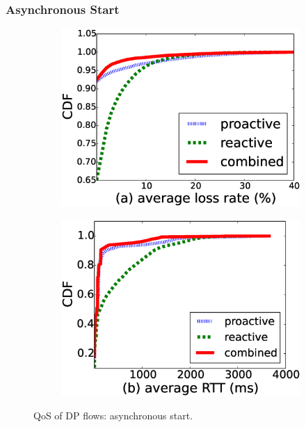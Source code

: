 
\subsubsection{Asynchronous Start}

\begin{figure}[!h]
  \begin{subfigure}[t]{0.49\linewidth}
   \centering
   \includegraphics[width=\columnwidth]{chap-scalims/figure/nonsyn-rttloss1.eps}
  \end{subfigure}
  \begin{subfigure}[t]{0.49\linewidth}
     \centering
     \includegraphics[width=\columnwidth]{chap-scalims/figure/nonsyn-rttloss2.eps}
    \end{subfigure}
\caption{QoS of DP flows: asynchronous start.}
\label{fig:nonsyn-rttloss}
\end{figure}

